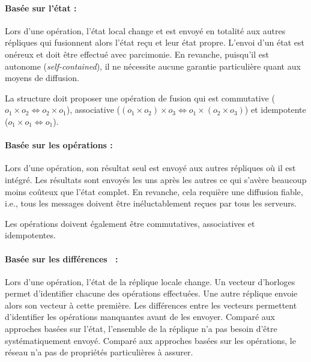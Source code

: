 \paragraph{Basée sur l'état :} Lors d'une opération, l'état local change et est
envoyé en totalité aux autres répliques qui fusionnent alors l'état reçu et leur
état propre. L'envoi d'un état est onéreux et doit être effectué avec
parcimonie. En revanche, puisqu'il est autonome (\emph{self-contained}), il ne
nécessite aucune garantie particulière quant aux moyens de diffusion.

\noindent La structure doit proposer une opération de fusion qui est commutative
($o_1 \times o_2 \Leftrightarrow o_2 \times o_1$), associative
($(o_1 \times o_2) \times o_3 \Leftrightarrow o_1 \times (o_2 \times o_3)$) et
idempotente ($o_1 \times o_1 \Leftrightarrow o_1$).

\paragraph{Basée sur les opérations :} Lors d'une opération, son résultat seul
est envoyé aux autres répliques où il est intégré. Les résultats sont envoyés
les uns après les autres ce qui s'avère beaucoup moins coûteux que l'état
complet. En revanche, cela requière une diffusion fiable, i.e., tous les
messages doivent être inéluctablement reçues par tous les serveurs.

\noindent Les opérations doivent également être commutatives, associatives et
idempotentes.

\paragraph{Basée sur les différences~\cite{vanderlinde2016delta} :} Lors d'une
opération, l'état de la réplique locale change. Un vecteur d'horloges permet
d'identifier chacune des opérations effectuées. Une autre réplique envoie alors
son vecteur à cette première. Les différences entre les vecteurs permettent
d'identifier les opérations manquantes avant de les envoyer. Comparé aux
approches basées sur l'état, l'ensemble de la réplique n'a pas besoin d'être
systématiquement envoyé. Comparé aux approches basées sur les opérations, le
réseau n'a pas de propriétés particulières à assurer.

%     
%     

